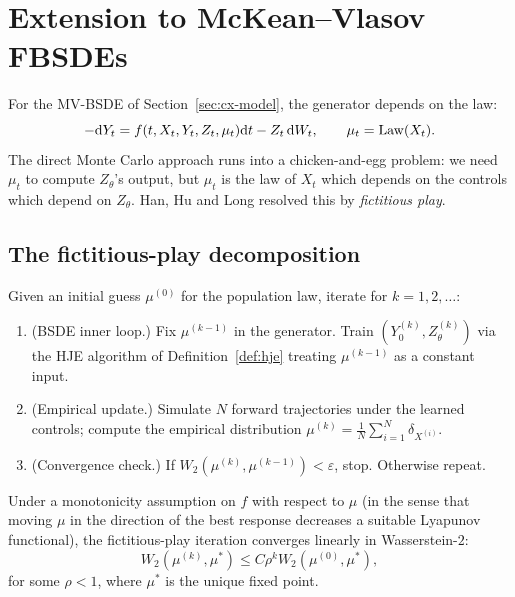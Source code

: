 \section{Extension to McKean--Vlasov FBSDEs}
\label{sec:mv-fbsde}

For the MV-BSDE of Section~\ref{sec:cx-model}, the generator depends on the law:
\begin{equation}
  -\mathrm{d} Y_t = f(t, X_t, Y_t, Z_t, \mu_t) \mathrm{d} t - Z_t \, \mathrm{d} W_t, \qquad \mu_t = \mathrm{Law}(X_t).
\end{equation}
The direct Monte Carlo approach runs into a chicken-and-egg problem: we need $\mu_t$ to compute $Z_\theta$'s output, but $\mu_t$ is the law of $X_t$ which depends on the controls which depend on $Z_\theta$. Han, Hu and Long \cite{han2022} resolved this by \emph{fictitious play}.

\subsection{The fictitious-play decomposition}

\begin{definition}
\label{def:neural-fp}
Given an initial guess $\mu^{(0)}$ for the population law, iterate for $k = 1, 2, \ldots$:
\begin{enumerate}[leftmargin=2em]
  \item (BSDE inner loop.) Fix $\mu^{(k-1)}$ in the generator. Train $(Y_0^{(k)}, Z^{(k)}_\theta)$ via the HJE algorithm of Definition~\ref{def:hje} treating $\mu^{(k-1)}$ as a constant input.
  \item (Empirical update.) Simulate $N$ forward trajectories under the learned controls; compute the empirical distribution $\mu^{(k)} = \frac{1}{N} \sum_{i=1}^{N} \delta_{X^{(i)}}$.
  \item (Convergence check.) If $W_2(\mu^{(k)}, \mu^{(k-1)}) < \varepsilon$, stop. Otherwise repeat.
\end{enumerate}
\end{definition}

\begin{theorem}
\label{thm:fp-convergence}
Under a monotonicity assumption on $f$ with respect to $\mu$ (in the sense that moving $\mu$ in the direction of the best response decreases a suitable Lyapunov functional), the fictitious-play iteration converges linearly in Wasserstein-$2$:
\begin{equation}
  W_2(\mu^{(k)}, \mu^*) \leq C \rho^k W_2(\mu^{(0)}, \mu^*),
\end{equation}
for some $\rho < 1$, where $\mu^*$ is the unique fixed point.
\end{theorem}


